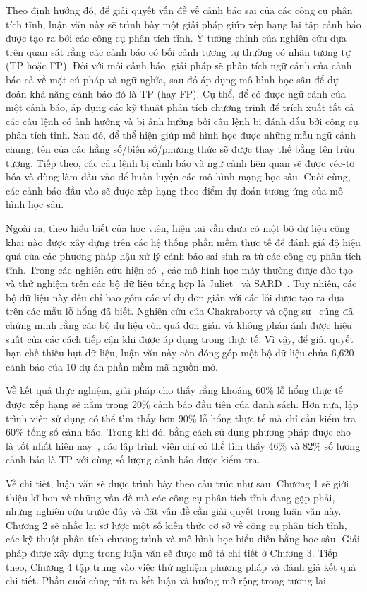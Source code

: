 Theo định hướng đó, để giải quyết vấn đề về cảnh báo sai của các công cụ phân tích tĩnh, luận văn này sẽ trình bày một giải pháp giúp xếp hạng lại tập cảnh báo được tạo ra bởi các công cụ phân tích tĩnh. Ý tưởng chính của nghiên cứu dựa trên quan sát rằng các cảnh báo có bối cảnh tương tự thường có nhãn tương tự (TP hoặc FP). Đối với mỗi cảnh báo, giải pháp sẽ phân tích ngữ cảnh của cảnh báo cả về mặt cú pháp và ngữ nghĩa, sau đó áp dụng mô hình học sâu để dự đoán khả năng cảnh báo đó là TP (hay FP). Cụ thể, để có được ngữ cảnh của một cảnh báo, \tool áp dụng các kỹ thuật phân tích chương trình để trích xuất tất cả các câu lệnh có ảnh hưởng và bị ảnh hưởng bởi câu lệnh bị đánh dấu bởi công cụ phân tích tĩnh. Sau đó, để thể hiện giúp mô hình học được những mẫu ngữ cảnh chung, tên của các hằng số/biến số/phương thức sẽ được thay thế bằng tên trừu tượng. Tiếp theo, các câu lệnh bị cảnh báo và ngữ cảnh liên quan sẽ được véc-tơ hóa và dùng làm đầu vào để huấn luyện các mô hình mạng học sâu. Cuối cùng, các cảnh báo đầu vào sẽ được xếp hạng theo điểm dự đoán tương ứng của mô hình học sâu.

Ngoài ra, theo hiểu biết của học viên, hiện tại vẫn chưa có một bộ dữ liệu công khai nào được xây dựng trên các hệ thống phần mềm thực tế để đánh giá độ hiệu quả của các phương pháp hậu xử lý cảnh báo sai sinh ra từ các công cụ phân tích tĩnh. Trong các nghiên cứu hiện có~\cite{flynn2018prioritizing, berman2019active}, các mô hình học máy thường được đào tạo và thử nghiệm trên các bộ dữ liệu tổng hợp là Juliet~\cite{JULIET} và SARD~\cite{SARD}. Tuy nhiên, các bộ dữ liệu này đều chỉ bao gồm các ví dụ đơn giản với các lỗi được tạo ra dựa trên các mẫu lỗ hổng đã biết. Nghiên cứu của Chakraborty và cộng sự~\cite{chakraborty2021deep} cũng đã chứng minh rằng các bộ dữ liệu còn quá đơn giản và không phản ánh được hiệu suất của các cách tiếp cận khi được áp dụng trong thực tế. Vì vậy, để giải quyết hạn chế thiếu hụt dữ liệu, luận văn này còn đóng góp một bộ dữ liệu chứa 6,620 cảnh báo của 10 dự án phần mềm mã nguồn mở.

Về kết quả thực nghiệm, giải pháp \tool cho thấy rằng khoảng 60\% lỗ hổng thực tế được \tool xếp hạng sẽ nằm trong 20\% cảnh báo đầu tiên của danh sách. Hơn nữa, lập trình viên sử dụng \tool có thể tìm thấy hơn 90\% lỗ hổng thực tế mà chỉ cần kiểm tra 60\% tổng số cảnh báo. Trong khi đó, bằng cách sử dụng phương pháp được cho là tốt nhất hiện nay~\cite{lee2019classifying}, các lập trình viên chỉ có thể tìm thấy 46\% và 82\% số lượng cảnh báo là TP với cùng số lượng cảnh báo được kiểm tra.

Về chi tiết, luận văn sẽ được trình bày theo cấu trúc như sau. Chương 1 sẽ giới thiệu kĩ hơn về những vấn đề mà các công cụ phân tích tĩnh đang gặp phải, những nghiên cứu trước đây và đặt vấn đề cần giải quyết trong luận văn này. Chương 2 sẽ nhắc lại sơ lược một số kiến thức cơ sở về công cụ phân tích tĩnh, các kỹ thuật phân tích chương trình và mô hình học biểu diễn bằng học sâu. Giải pháp được xây dựng trong luận văn sẽ được mô tả chi tiết ở Chương 3. Tiếp theo, Chương 4 tập trung vào việc thử nghiệm phương pháp và đánh giá kết quả chi tiết. Phần cuối cùng rút ra kết luận và hướng mở rộng trong tương lai.

\cleardoublepage